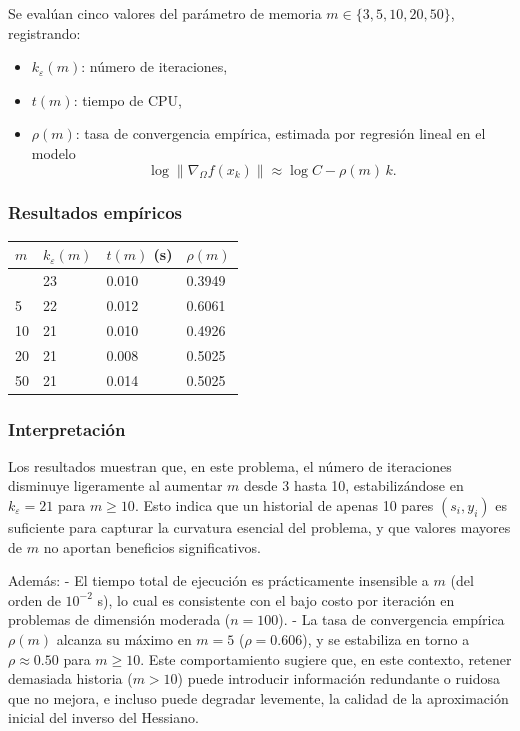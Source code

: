 \documentclass[
  spanish,
  us-letterpaper,
]{scrreprt}
\providecommand{\tightlist}{%
  \setlength{\itemsep}{0pt}\setlength{\parskip}{0pt}}
\numberwithin{equation}{section}
\begin{document}
Se evalúan cinco valores del parámetro de memoria
\(m \in \{3, 5, 10, 20, 50\}\), registrando:

\begin{itemize}
\tightlist
\item
  \(k_{\varepsilon}(m)\): número de iteraciones,
\item
  \(t(m)\): tiempo de CPU,
\item
  \(\rho(m)\): tasa de convergencia empírica, estimada por regresión
  lineal en el modelo \[
    \log \|\nabla_\Omega f(x_k)\| \approx \log C - \rho(m)\, k.
    \]
\end{itemize}

\subsubsection{Resultados empíricos}\label{resultados-empuxedricos}

\begin{longtable}[]{@{}llll@{}}
\toprule\noalign{}
\(m\) & \(k_{\varepsilon}(m)\) & \(t(m)\) (s) & \(\rho(m)\) \\
\midrule\noalign{}
\endhead
\bottomrule\noalign{}
\endlastfoot
3 & 23 & 0.010 & 0.3949 \\
5 & 22 & 0.012 & 0.6061 \\
10 & 21 & 0.010 & 0.4926 \\
20 & 21 & 0.008 & 0.5025 \\
50 & 21 & 0.014 & 0.5025 \\
\end{longtable}

\subsubsection{Interpretación}\label{interpretaciuxf3n}

Los resultados muestran que, en este problema, el número de iteraciones
disminuye ligeramente al aumentar \(m\) desde 3 hasta 10,
estabilizándose en \(k_\varepsilon = 21\) para \(m \geq 10\). Esto
indica que un historial de apenas 10 pares \((s_i, y_i)\) es suficiente
para capturar la curvatura esencial del problema, y que valores mayores
de \(m\) no aportan beneficios significativos.

Además: - El tiempo total de ejecución es prácticamente insensible a
\(m\) (del orden de \(10^{-2}\) s), lo cual es consistente con el bajo
costo por iteración en problemas de dimensión moderada (\(n = 100\)). -
La tasa de convergencia empírica \(\rho(m)\) alcanza su máximo en
\(m = 5\) (\(\rho = 0.606\)), y se estabiliza en torno a
\(\rho \approx 0.50\) para \(m \geq 10\). Este comportamiento sugiere
que, en este contexto, retener demasiada historia (\(m > 10\)) puede
introducir información redundante o ruidosa que no mejora, e incluso
puede degradar levemente, la calidad de la aproximación inicial del
inverso del Hessiano.
\end{document}
